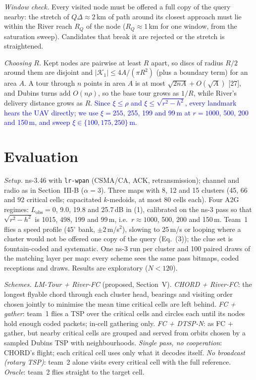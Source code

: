 \documentclass[conference]{IEEEtran}
\newcommand{\new}[1]{\textcolor{blue}{#1}}
\begin{document}
\setcounter{section}{4}\setcounter{figure}{3}\setcounter{equation}{5}\setcounter{algorithm}{2}
{\color{blue}}

\emph{Window check.} Every visited node must be offered a full copy of the query nearby: the stretch of
$Q\Delta \approx 2$\,km of path around its closest approach must lie within the River reach $R_Q$ of the node
($R_Q \approx 1$\,km for one window, from the saturation sweep). Candidates that break it are rejected or the stretch
is straightened.

\emph{Choosing $R$.} Kept nodes are pairwise at least $R$ apart, so discs of radius $R/2$ around them are disjoint and
$|\mathcal{K}_1| \le 4A/(\pi R^2)$ (plus a boundary term) for an area $A$. A tour through $n$ points in area $A$ is at
most $\sqrt{2nA} + O(\sqrt{A})$ [27], and Dubins turns add $O(n\rho)$, so the base tour grows as $1/R$, while River's
delivery distance grows as $R$. \new{Since $\xi \le \rho$ and $\xi \le \sqrt{r^2-h^2}$, every landmark hears the UAV
directly; we use $\xi = 255$, 255, 199 and 99\,m at $r = 1000$, 500, 200 and 150\,m, and sweep
$\xi \in \{100, 175, 250\}$\,m.}

{\color{blue}
\section{Evaluation}
\emph{Setup.} ns-3.46 with \texttt{lr-wpan} (CSMA/CA, ACK, retransmission); channel and radio as in Section~III-B
($\alpha = 3$). Three maps with 8, 12 and 15 clusters (45, 66 and 92 critical cells; capacitated $k$-medoids, at most
80 cells each). Four A2G regimes: $L_{\mathrm{obs}} = 0$, 9.0, 19.8 and 25.7\,dB in (1), calibrated on the ns-3 pass
so that $\sqrt{r^2-h^2}$ is 1015, 498, 199 and 99\,m, i.e.\ $r \approx 1000$, 500, 200 and 150\,m. Team~1 flies a
speed profile (45$^\circ$ bank, $\pm2$\,m/s$^2$), slowing to 25\,m/s or looping where a cluster would not be offered one
copy of the query (Eq.~(3)); the clue set is fountain-coded and systematic. One ns-3 run per cluster and 100 paired
draws of the matching layer per map: every scheme sees the same pass bitmaps, coded receptions and draws. Results
are exploratory ($N < 120$).

\emph{Schemes.} \emph{LM-Tour + River-FC} (proposed, Section~V). \emph{CHORD + River-FC}: the longest flyable chord
through each cluster head, bearings and visiting order chosen jointly to minimise the mean time critical cells are
left behind. \emph{FC + gather}: team~1 flies a TSP over the critical cells and circles each until its nodes hold
enough coded packets; in-cell gathering only. \emph{FC + DTSP-N}: as FC + gather, but nearby critical cells are
grouped and served from orbits chosen by a sampled Dubins TSP with neighbourhoods. \emph{Single pass, no
cooperation}: CHORD's flight; each critical cell uses only what it decodes itself. \emph{No broadcast (rotary TSP)}:
team~2 alone visits every critical cell with the full reference. \emph{Oracle}: team~2 flies straight to the target
cell.
}
\end{document}
